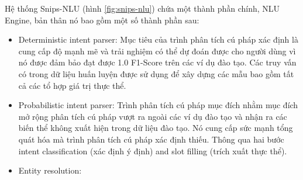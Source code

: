 \begin{itemize}
          Hệ thống Snips-NLU (hình \ref{fig:snips-nlu}) chứa một thành phần chính, NLU Engine, bản thân nó bao gồm một số thành phần sau:
          \begin{itemize}
              \item Deterministic intent parser: Mục tiêu của trình phân tích cú pháp xác định là cung cấp độ mạnh mẽ và trải nghiệm có thể dự đoán được cho người dùng vì nó được đảm bảo đạt được 1.0 F1-Score trên các ví dụ đào tạo. Các truy vấn có trong dữ liệu huấn luyện được sử dụng để xây dựng các mẫu bao gồm tất cả các tổ hợp giá trị thực thể.
              \item Probabilistic intent parser: Trình phân tích cú pháp mục đích nhằm mục đích mở rộng phân tích cú pháp vượt ra ngoài các ví dụ đào tạo và nhận ra các biến thể không xuất hiện trong dữ liệu đào tạo. Nó cung cấp sức mạnh tổng quát hóa mà trình phân tích cú pháp xác định thiếu. Thông qua hai bước intent classification (xác định ý định) and slot filling (trích xuất thực thể).
              \item Entity resolution:
          \end{itemize}
\end{itemize}
